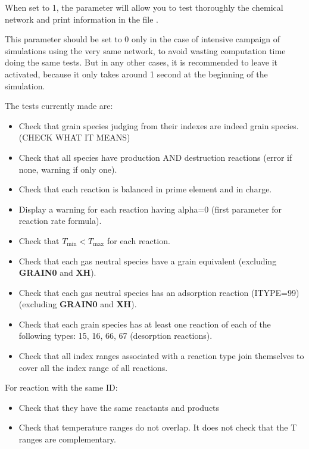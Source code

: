 \documentclass[english,a4paper,twoside]{article}
\begin{document}
When set to 1, the parameter  will allow you to test thoroughly the chemical network and print information in the file . 

\begin{remarque}
This parameter should be set to 0 only in the case of intensive campaign of simulations using the very same network, to avoid wasting computation time doing the same tests. But in any other cases, it is recommended to leave it activated, because it only takes around 1 second at the beginning of the simulation.
\end{remarque}

The tests currently made are:
\begin{itemize}
\item Check that grain species judging from their indexes are indeed grain species. (CHECK WHAT IT MEANS)
\item Check that all species have production AND destruction reactions (error if none, warning if only one).
\item Check that each reaction is balanced in prime element and in charge.
\item Display a warning for each reaction having alpha=0 (first parameter for reaction rate formula).
\item Check that $T_\text{min} < T_\text{max}$ for each reaction.
\item Check that each gas neutral species have a grain equivalent (excluding \textbf{GRAIN0} and \textbf{XH}).
\item Check that each gas neutral species has an adsorption reaction (ITYPE=99) (excluding \textbf{GRAIN0} and \textbf{XH}).
\item Check that each grain species has at least one reaction of each of the following types: 15, 16, 66, 67 (desorption reactions).
\item Check that all index ranges associated with a reaction type join themselves to cover all the index range of all reactions.
\end{itemize}

For reaction with the same ID:
\begin{itemize}
\item Check that they have the same reactants and products
\item Check that temperature ranges do not overlap. It does not check that the T ranges are complementary.
\end{itemize}
\end{document}
